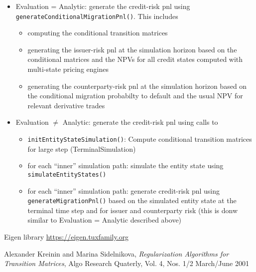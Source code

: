 \documentclass[12pt, a4paper]{article}
\begin{document}
\begin{itemize}
\item Evaluation = Analytic: generate the credit-risk pnl using \verb+generateConditionalMigrationPnl()+. This includes
  \begin{itemize}
  \item computing the conditional transition matrices
  \item generating the issuer-risk pnl at the simulation horizon based on the conditional matrices and the NPVs for all
    credit states computed with multi-state pricing engines
  \item generating the counterparty-risk pnl at the simulation horizon based on the conditional migration probabilty to
    default and the usual NPV for relevant derivative trades
  \end{itemize}
\item Evaluation $\neq$ Analytic: generate the credit-risk pnl using calls to
  \begin{itemize}
  \item \verb+initEntityStateSimulation()+: Compute conditional transition matrices for large step (TerminalSimulation)
  \item for each ``inner'' simulation path: simulate the entity state using \verb+simulateEntityStates()+
  \item for each ``inner'' simulation path: generate credit-risk pnl using \verb+generateMigrationPnl()+ based on the
    simulated entity state at the terminal time step and for issuer and counterparty risk (this is donw similar to
    Evaluation = Analytic described above)
  \end{itemize}
\end{itemize}

\begin{thebibliography}{*}

 Eigen library \url{https://eigen.tuxfamily.org}
  
 Alexander Kreinin and Marina Sidelnikova, {\em Regularization Algorithms for Transition Matrices}, Algo Research Quaterly, Vol. 4, Nos. 1/2 March/June 2001

\end{thebibliography}
\end{document}
